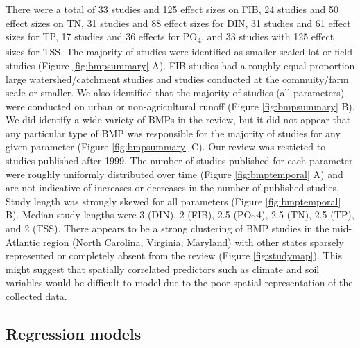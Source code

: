 \documentclass[utf8]{FrontiersinHarvard}
\begin{document}
There were a total of 33 studies and 125 effect sizes on FIB, 24 studies and 50 effect sizes on TN, 31 studies and 88 effect sizes for DIN, 31 studies and 61 effect sizes for TP, 17 studies and 36 effects for PO\textsubscript{4}, and 33 studies with 125 effect sizes for TSS.
The majority of studies were identified as smaller scaled lot or field studies (Figure \ref{fig:bmpsummary} A).
FIB studies had a roughly equal proportion large watershed/catchment studies and studies conducted at the commuity/farm scale or smaller.
We also identified that the majority of studies (all parameters) were conducted on urban or non-agricultural runoff (Figure \ref{fig:bmpsummary} B).
We did identify a wide variety of BMPs in the review, but it did not appear that any particular type of BMP was responsible for the majority of studies for any given parameter (Figure \ref{fig:bmpsummary} C).
Our review was resticted to studies published after 1999.
The number of studies published for each parameter were roughly uniformly distributed over time (Figure \ref{fig:bmptemporal} A) and are not indicative of increases or decreases in the number of published studies.
Study length was strongly skewed for all parameters (Figure \ref{fig:bmptemporal} B). Median study lengths were 3 (DIN), 2 (FIB), 2.5 (PO\textasciitilde4), 2.5 (TN), 2.5 (TP), and 2 (TSS).
There appears to be a strong clustering of BMP studies in the mid-Atlantic region (North Carolina, Virginia, Maryland) with other states sparsely represented or completely absent from the review (Figure \ref{fig:studymap}).
This might suggest that spatially correlated predictors such as climate and soil variables would be difficult to model due to the poor spatial representation of the collected data.

\hypertarget{regression-models}{%
\subsection{Regression models}\label{regression-models}}
\end{document}
